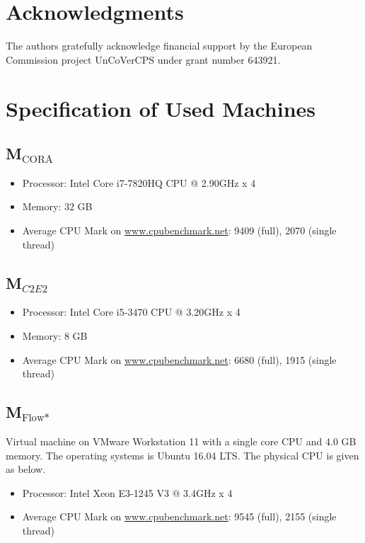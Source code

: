 \documentclass[EPiC]{easychair}
\begin{document}
\section{Acknowledgments}
\label{sect:acks}


The authors gratefully acknowledge financial support by the European Commission project UnCoVerCPS under grant number 643921.


\appendix
\section{Specification of Used Machines} \label{sec:machines}

\subsection{\texorpdfstring{M$_{\text{CORA}}$}{M-CORA}} \label{sec:machine:CORA}

\begin{itemize}
    \item Processor: Intel Core i7-7820HQ CPU @ 2.90GHz x 4 
    \item Memory: 32 GB
    \item Average CPU Mark on \url{www.cpubenchmark.net}: 9409 (full), 2070 (single thread)
\end{itemize}

\subsection{\texorpdfstring{M$_{C2E2}$}{M-C2E2}} \label{sec:machine:C2E2}
\begin{itemize}
	\item Processor: Intel Core i5-3470 CPU @ 3.20GHz x 4 
    \item Memory: 8 GB
    \item Average CPU Mark on \url{www.cpubenchmark.net}: 6680 (full), 1915 (single thread)
\end{itemize}

\subsection{\texorpdfstring{M$_{\text{Flow*}}$}{M-Flow*}} \label{sec:machine:flowstar}
Virtual machine on VMware Workstation 11 with a single core CPU and 4.0 GB memory. The operating systems is Ubuntu 16.04 LTS. The physical CPU is given as below.
\begin{itemize}
 \item Processor: Intel Xeon E3-1245 V3 @ 3.4GHz x 4
 \item Average CPU Mark on \url{www.cpubenchmark.net}: 9545 (full), 2155 (single thread)
\end{itemize}
\end{document}
